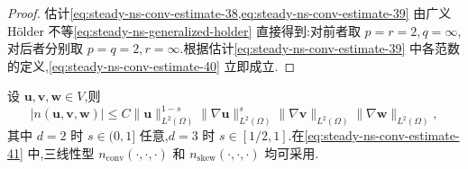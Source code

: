 \begin{proof}
估计\cref{eq:steady-ns-conv-estimate-38,eq:steady-ns-conv-estimate-39} 由广义 Hölder 不等\cref{eq:steady-ns-generalized-holder} 直接得到:对前者取 $p=r=2,q=\infty$,对后者分别取 $p=q=2,r=\infty$.根据估计\cref{eq:steady-ns-conv-estimate-39} 中各范数的定义,\cref{eq:steady-ns-conv-estimate-40} 立即成立.
\end{proof}

\begin{lemma}[对流项的估计]\label{lem:steady-ns-convection-estimates-3}
设 $\bm{u},\bm{v},\bm{w}\in V$,则
\begin{equation}\label{eq:steady-ns-conv-estimate-41}
  |n(\bm{u},\bm{v},\bm{w})|
    \le C\|\bm{u}\|_{L^2(\Omega)}^{1-s}
       \|\nabla\bm{u}\|_{L^2(\Omega)}^s
       \|\nabla\bm{v}\|_{L^2(\Omega)}
       \|\nabla\bm{w}\|_{L^2(\Omega)},
\end{equation}
其中 $d=2$ 时 $s\in(0,1]$ 任意,$d=3$ 时 $s\in[1/2,1]$.在\cref{eq:steady-ns-conv-estimate-41} 中,三线性型 $n_{\mathrm{conv}}(\cdot,\cdot,\cdot)$ 和 $n_{\mathrm{skew}}(\cdot,\cdot,\cdot)$ 均可采用.
\end{lemma}

